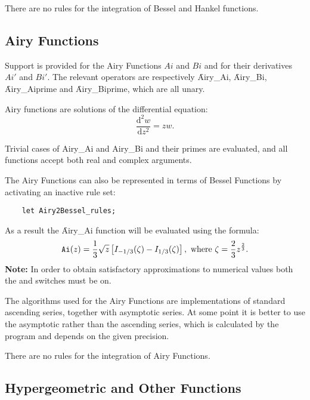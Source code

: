 There are no rules for the integration of Bessel and Hankel functions.

\subsection{Airy Functions}
\hypertarget{operator:AIRY_AI}{}
\hypertarget{operator:AIRY_AIPRIME}{}
\hypertarget{operator:AIRY_BI}{}
\hypertarget{operator:AIRY_BIPRIME}{}
\hypertarget{AIRYF}{}

Support is provided for the Airy Functions $Ai$ and $Bi$ and for their
derivatives $Ai'$ and $Bi'$.  The relevant operators are
respectively \f{Airy\_Ai}, \f{Airy\_Bi}, \f{Airy\_Aiprime} and
\f{Airy\_Biprime}, which are all unary.

Airy functions are solutions of the differential equation:
\[ \frac{\mathrm{d}^2 w}{\mathrm{d}z^2} = z w.\]

Trivial cases of Airy\_Ai and Airy\_Bi and their primes are evaluated,
and all functions accept both real and complex arguments.

The Airy Functions can also be represented in terms of Bessel
Functions by activating an inactive rule set:
\begin{verbatim}
    let Airy2Bessel_rules;
\end{verbatim}
As a result the \f{Airy\_Ai} function will be evaluated using the formula:
\[
\texttt{Ai}(z) =  \frac{1}{3} \sqrt{z} \left[I_{-1/3}(\zeta)
- I_{1/3}(\zeta)\right], \text{ where }
 \zeta =  \frac{2}{3} z^{\frac{2}{3}}.
\]
\textbf{Note:} In order to obtain satisfactory approximations
to numerical values both the  and  switches
must be on.

The algorithms used for the Airy Functions are implementations of
standard ascending series, together with asymptotic series.  At some
point it is better to use the asymptotic rather than the ascending
series, which is calculated by the program and depends on the given
precision.

There are no rules for the integration of Airy Functions.

\subsection{Hypergeometric and Other Functions}
\hypertarget{operator:KUMMERM}{}
\hypertarget{operator:KUMMERU}{}
\hypertarget{operator:LOMMEL1}{}
\hypertarget{operator:LOMMEL2}{}
\hypertarget{operator:STRUVEH}{}
\hypertarget{operator:STRUVEL}{}
\hypertarget{operator:WHITTAKERM}{}
\hypertarget{operator:WHITTAKERU}{}
\hypertarget{HYPERGEOM}{}

